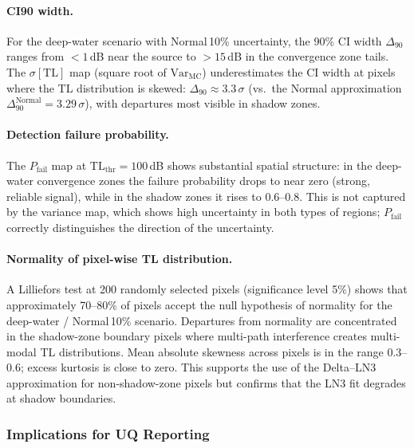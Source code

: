 \documentclass[11pt,a4paper]{article}
\newcommand{\Var}{\mathrm{Var}}
\newcommand{\TL}{\mathrm{TL}}
\begin{document}
\paragraph{CI90 width.}
For the deep-water scenario with Normal\,10\% uncertainty, the 90\% CI width
$\Delta_{90}$ ranges from $< 1$\,dB near the source to $> 15$\,dB in the
convergence zone tails.  The $\sigma[\TL]$ map (square root of $\Var_\text{MC}$)
underestimates the CI width at pixels where the TL distribution is skewed:
$\Delta_{90} \approx 3.3\,\sigma$ (vs.\ the Normal approximation $\Delta_{90}^\text{Normal} = 3.29\,\sigma$),
with departures most visible in shadow zones.

\paragraph{Detection failure probability.}
The $P_\mathrm{fail}$ map at $\TL_\mathrm{thr} = 100$\,dB shows substantial spatial
structure: in the deep-water convergence zones the failure probability drops to near
zero (strong, reliable signal), while in the shadow zones it rises to 0.6--0.8.
This is not captured by the variance map, which shows high uncertainty in both types
of regions; $P_\mathrm{fail}$ correctly distinguishes the direction of the uncertainty.

\paragraph{Normality of pixel-wise TL distribution.}
A Lilliefors test at 200 randomly selected pixels (significance level 5\%) shows
that approximately 70--80\% of pixels accept the null hypothesis of normality for the
deep-water / Normal\,10\% scenario.  Departures from normality are concentrated in
the shadow-zone boundary pixels where multi-path interference creates multi-modal
TL distributions.
Mean absolute skewness across pixels is in the range 0.3--0.6; excess kurtosis
is close to zero.  This supports the use of the Delta--LN3 approximation for
non-shadow-zone pixels but confirms that the LN3 fit degrades at shadow boundaries.

\subsubsection{Implications for UQ Reporting}
\end{document}

